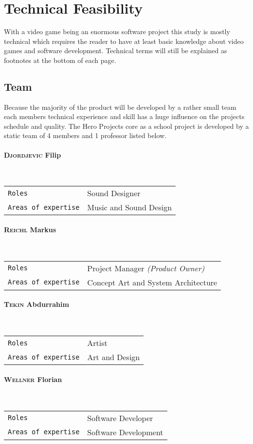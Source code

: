 \documentclass[11pt]{article}
\begin{document}
\newpage

\section{Technical Feasibility}
With a video game being an enormous software project this study is mostly technical which requires the reader to have at least basic knowledge about video games and software development.
Technical terms will still be explained as footnotes at the bottom of each page.

\subsection{Team}
Because the majority of the product will be developed by a rather small team each members technical experience and skill has a huge influence on the projects schedule and quality.
The Hero Projects core as a school project is developed by a static team of 4 members and 1 professor listed below.
\paragraph{\textsc{Djordjevic} Filip} ~\\
\begin{tabular}{ll}
\texttt{Roles} & Sound Designer\\
\texttt{Areas of expertise} & Music and Sound Design
\end{tabular}
\paragraph{\textsc{Reichl} Markus} ~\\
\begin{tabular}{ll}
\texttt{Roles} & Project Manager \textit{\small{(Product Owner)}}\\
\texttt{Areas of expertise} & Concept Art and System Architecture
\end{tabular}
\paragraph{\textsc{Tekin} Abdurrahim} ~\\
\begin{tabular}{ll}
\texttt{Roles} & Artist\\
\texttt{Areas of expertise} & Art and Design
\end{tabular}
\paragraph{\textsc{Wellner} Florian} ~\\
\begin{tabular}{ll}
\texttt{Roles} & Software Developer\\
\texttt{Areas of expertise} & Software Development
\end{tabular}
\end{document}
